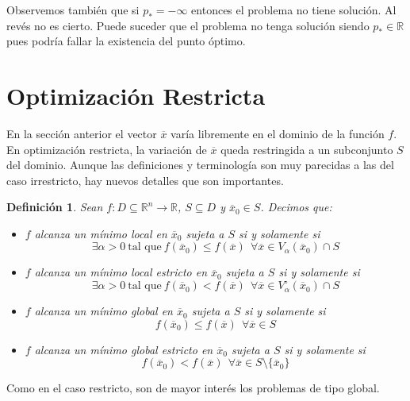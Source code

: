 \documentclass[11pt]{report}
\newtheorem{definition}{Definición}[section]
\newcommand{\Rn}{\mathbb{R}^{n}}
\newcommand{\R}{\mathbb{R}}
\newcommand{\x}{\overline{x}}
\newcommand{\xz}{\overline{x}_{0}}
\newcommand{\po}{p_{*}}
\begin{document}
Observemos también que si $\po=-\infty$ entonces el problema no tiene solución. Al revés no es cierto. Puede suceder que el problema no tenga solución siendo $\po\in\R$ pues podría fallar la existencia del punto óptimo.

\section{Optimización Restricta}

En la sección anterior el vector $\x$ varía libremente en el dominio de la función $f$. En optimización restricta, la variación de $\x$ queda restringida a un subconjunto $S$ del dominio. Aunque las definiciones y terminología son muy parecidas a las del caso irrestricto, hay nuevos detalles que son importantes.

\begin{definition}
Sean $f:D\subseteq\Rn\rightarrow\R$, $S\subseteq D$ y $\xz\in S$. Decimos que:
\begin{itemize}
\item[(i)] $f$ alcanza un mínimo local en $\xz$ sujeta a $S$ si y solamente si $$\exists\alpha >0\ \text{tal que}\ f(\xz)\leq f(\x)\ \ \forall\x\in V_{\alpha}(\xz)\cap S$$
\item[(ii)] $f$ alcanza un mínimo local estricto en $\xz$ sujeta a $S$ si y solamente si $$\exists\alpha >0\ \text{tal que}\ f(\xz)< f(\x)\ \ \forall\x\in V_{\alpha}^{\circ}(\xz)\cap S$$
\item[(iii)] $f$ alcanza un mínimo global en $\xz$ sujeta a $S$ si y solamente si $$f(\xz)\leq f(\x)\ \ \forall\x\in S$$
\item[(iv)] $f$ alcanza un mínimo global estricto en $\xz$ sujeta a $S$ si y solamente si $$f(\xz)< f(\x)\ \ \forall\x\in S\setminus{\{\xz\}}$$
\end{itemize}
\end{definition}

Como en el caso restricto, son de mayor interés los problemas de tipo global.
\end{document}
